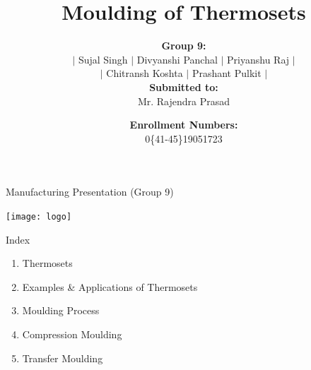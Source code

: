 \documentclass[11pt,t]{beamer}
\title[Moulding of Thermosets]{\textbf{\Large Moulding of Thermosets}\vspace*{-10pt}}
\author[Sujal, Divyanshi, Priyanshu \ldots]{%
    \textbf{Group 9:}\\%
    \(|\) Sujal Singh \(|\) Divyanshi Panchal \(|\) Priyanshu Raj \(|\)\\\(|\) Chitransh Koshta \(|\) Prashant
    Pulkit \(|\)\\[10pt]%
    \textbf{Submitted to:}\\Mr. Rajendra Prasad\vspace*{-20pt}
}
\date[Chitransh, Prashant]{\textbf{Enrollment Numbers:}\\0\{41-45\}19051723}
\begin{document}
    \begin{frame}{Manufacturing Presentation (Group 9)}
        \\[5pt]
        \begin{center}
            \texttt{[image: logo]}
        \end{center}\vspace*{-15pt}
        \maketitle
    \end{frame}

    \begin{frame}[allowframebreaks]{Index}
        \begin{enumerate}
            \large
            \item Thermosets
            \item Examples \& Applications of Thermosets
            \item Moulding Process
            \item Compression Moulding
            \item Transfer Moulding
        \end{enumerate}
    \end{frame}
\end{document}
